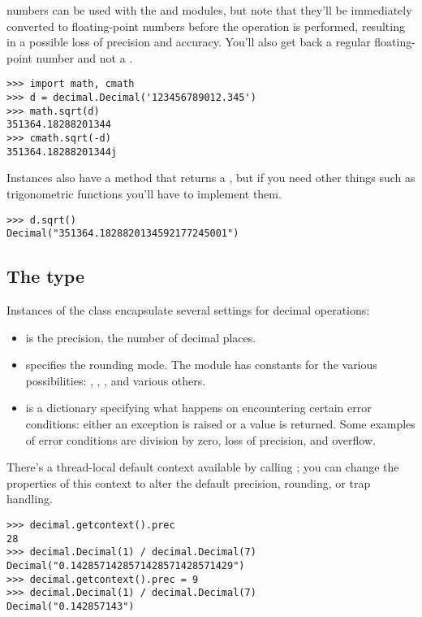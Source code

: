 \documentclass{howto}
\begin{document}
 numbers can be used with the  and
 modules, but note that they'll be immediately converted to 
floating-point numbers before the operation is performed, resulting in
a possible loss of precision and accuracy.  You'll also get back a
regular floating-point number and not a .  

\begin{verbatim}
>>> import math, cmath
>>> d = decimal.Decimal('123456789012.345')
>>> math.sqrt(d)
351364.18288201344
>>> cmath.sqrt(-d)
351364.18288201344j
\end{verbatim}

Instances also have a  method that returns a
, but if you need other things such as trigonometric
functions you'll have to implement them.

\begin{verbatim}
>>> d.sqrt()
Decimal("351364.1828820134592177245001")
\end{verbatim}


\subsection{The  type}

Instances of the  class encapsulate several settings for 
decimal operations:

\begin{itemize}
 \item {} is the precision, the number of decimal places.
 \item {} specifies the rounding mode.  The 
       module has constants for the various possibilities:
       , , , and various others.
 \item {} is a dictionary specifying what happens on
encountering certain error conditions: either  an exception is raised or 
a value is returned.  Some examples of error conditions are
division by zero, loss of precision, and overflow.
\end{itemize}

There's a thread-local default context available by calling
; you can change the properties of this context
to alter the default precision, rounding, or trap handling.

\begin{verbatim}
>>> decimal.getcontext().prec
28
>>> decimal.Decimal(1) / decimal.Decimal(7)
Decimal("0.1428571428571428571428571429")
>>> decimal.getcontext().prec = 9 
>>> decimal.Decimal(1) / decimal.Decimal(7)
Decimal("0.142857143")
\end{verbatim}
\end{document}
